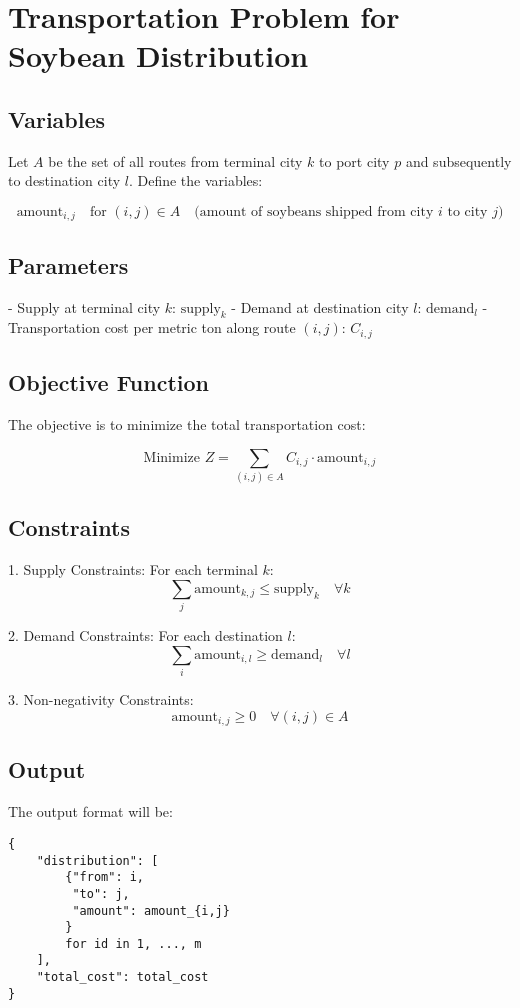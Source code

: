 \documentclass{article}
\begin{document}
\section*{Transportation Problem for Soybean Distribution}

\subsection*{Variables}

Let \( A \) be the set of all routes from terminal city \( k \) to port city \( p \) and subsequently to destination city \( l \). Define the variables:

\[
\text{amount}_{i,j} \quad \text{for } (i,j) \in A \quad \text{(amount of soybeans shipped from city } i \text{ to city } j\text{)}
\]

\subsection*{Parameters}

- Supply at terminal city \( k \): \( \text{supply}_k \)
- Demand at destination city \( l \): \( \text{demand}_l \)
- Transportation cost per metric ton along route \( (i,j) \): \( C_{i,j} \)

\subsection*{Objective Function}

The objective is to minimize the total transportation cost:

\[
\text{Minimize } Z = \sum_{(i,j) \in A} C_{i,j} \cdot \text{amount}_{i,j}
\]

\subsection*{Constraints}

1. Supply Constraints:
   For each terminal \( k \):
   \[
   \sum_{j} \text{amount}_{k,j} \leq \text{supply}_k \quad \forall k
   \]

2. Demand Constraints:
   For each destination \( l \):
   \[
   \sum_{i} \text{amount}_{i,l} \geq \text{demand}_l \quad \forall l
   \]

3. Non-negativity Constraints:
   \[
   \text{amount}_{i,j} \geq 0 \quad \forall (i,j) \in A
   \]

\subsection*{Output}

The output format will be:

\begin{verbatim}
{
    "distribution": [
        {"from": i,
         "to": j,
         "amount": amount_{i,j}
        }
        for id in 1, ..., m
    ],
    "total_cost": total_cost
}
\end{verbatim}
\end{document}
